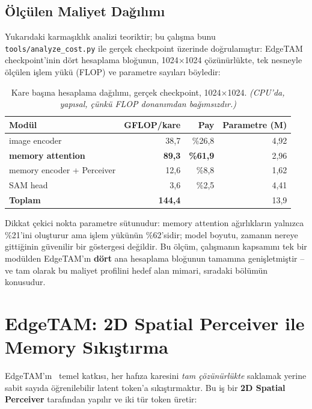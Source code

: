 \subsection{Ölçülen Maliyet Dağılımı}
\label{sec:proje-eslesme}

Yukarıdaki karmaşıklık analizi teoriktir; bu çalışma bunu
\texttt{tools/analyze\_cost.py} ile gerçek checkpoint üzerinde
doğrulamıştır: EdgeTAM checkpoint'inin dört hesaplama bloğunun,
1024×1024 çözünürlükte, tek nesneyle ölçülen işlem yükü (FLOP) ve
parametre sayıları böyledir:

\begin{table}[H]
  \centering
  \caption{Kare başına hesaplama dağılımı, gerçek checkpoint,
    1024×1024. \emph{(CPU'da, yapısal, çünkü FLOP donanımdan
    bağımsızdır.)}}
  \label{tab:flop-dagilimi-arkaplan}
  \begin{tabular}{lrrr}
    \toprule
    Modül & GFLOP/kare & Pay & Parametre (M) \\
    \midrule
    image encoder & 38,7 & \%26,8 & 4,92 \\
    \textbf{memory attention} & \textbf{89,3} & \textbf{\%61,9} & 2,96 \\
    memory encoder + Perceiver & 12,6 & \%8,8 & 1,62 \\
    SAM head & 3,6 & \%2,5 & 4,41 \\
    \midrule
    \textbf{Toplam} & \textbf{144,4} & & 13,9 \\
    \bottomrule
  \end{tabular}
\end{table}

Dikkat çekici nokta parametre sütunudur: memory attention ağırlıkların
yalnızca \%21'ini oluşturur ama işlem yükünün \%62'sidir; model
boyutu, zamanın nereye gittiğinin güvenilir bir göstergesi değildir.
Bu ölçüm, çalışmanın kapsamını tek bir modülden EdgeTAM'ın
\textbf{dört} ana hesaplama bloğunun tamamına genişletmiştir -- ve tam
olarak bu maliyet profilini hedef alan mimari, sıradaki bölümün
konusudur.

\section{EdgeTAM: 2D Spatial Perceiver ile Memory Sıkıştırma}
\label{sec:edgetam-perceiver}

EdgeTAM'ın~\cite{zhou2025edgetam} temel katkısı, her hafıza karesini
\emph{tam çözünürlükte} saklamak yerine sabit sayıda öğrenilebilir
latent token'a sıkıştırmaktır. Bu iş bir \textbf{2D Spatial Perceiver}
tarafından yapılır ve iki tür token üretir:

